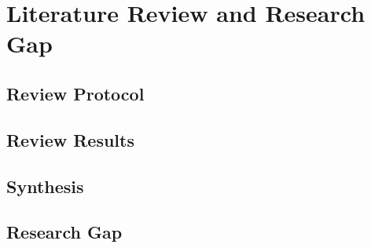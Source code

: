 \chapter{Literature Review and Research Gap}
\label{chap:literature-review}

\section{Review Protocol}
\label{sec:review-protocol}

\section{Review Results}
\label{sec:review-results}

\section{Synthesis}
\label{sec:review-synthesis}

\section{Research Gap}
\label{sec:research-gap}
